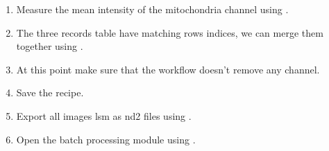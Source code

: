 \begin{enumerate}
    \item Measure the mean intensity of the mitochondria channel using .
    \item The three records table have matching rows indices, we can merge them together using .
    \item At this point make sure that the workflow doesn't remove any channel.
    \item Save the recipe.
    \item Export all images lsm as nd2 files using .
    \item Open the batch processing module using .
\end{enumerate}
